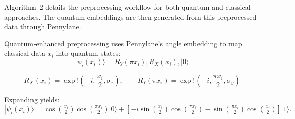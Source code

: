 \documentclass[pdflatex,sn-mathphys-num]{sn-jnl}%
\begin{document}
Algorithm~2 details the preprocessing workflow for both quantum and classical approaches. The quantum embeddings are then generated from this preprocessed data through Pennylane.

Quantum-enhanced preprocessing uses Pennylane's angle embedding to map classical data $x_i$ into quantum states:
\begin{equation}
\label{eq:state_prep}
\lvert \psi_i(x_i) \rangle
= R_Y(\pi x_i), R_X(x_i), \lvert 0 \rangle
\tag{4.1}
\end{equation}

\begin{equation}
\label{eq:rx}
R_X(x_i)
= \exp!\left(- i, \frac{x_i}{2}, \sigma_x \right),
\qquad
R_Y(\pi x_i)
= \exp!\left(- i, \frac{\pi x_i}{2}, \sigma_y \right)
\tag{4.2}
\end{equation}

Expanding yields:
\begin{equation}
| \psi_i(x_i) \rangle
= \cos\!\left(\tfrac{x_i}{2}\right)\cos\!\left(\tfrac{\pi x_i}{2}\right) |0\rangle
+ \left[ -i \sin\!\left(\tfrac{x_i}{2}\right)\cos\!\left(\tfrac{\pi x_i}{2}\right) 
- \sin\!\left(\tfrac{\pi x_i}{2}\right)\cos\!\left(\tfrac{x_i}{2}\right) \right] |1\rangle .
\end{equation}
\end{document}
